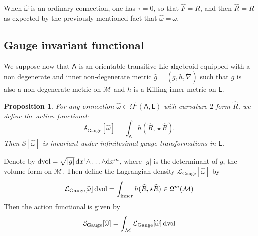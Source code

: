 \documentclass[number]{elsarticle}
\newtheorem{proposition}[theorem]{Proposition}
\theoremstyle{definition}
\theoremstyle{remark}
\numberwithin{equation}{section}
\begin{document}
When ${\widehat{\omega}}$ is an ordinary connection, one has ${\tau} = 0$, so that ${{\widehat{F}}} = R$, and then ${\widehat{R}} = R$ as expected by the previously mentioned fact that ${\widehat{\omega}} = \omega$.

\subsection{Gauge invariant functional}

We suppose now that ${{{{\mathbf{\mathsf{{A}}}}}}}$ is an orientable transitive Lie algebroid equipped with a non degenerate and inner non-degenerate metric ${{\widehat{g}}} = (g,h,{{\mathring{{\nabla}}}})$ such that $g$ is also a non-degenerate metric on ${{{{\mathcal{{M}}}}}}$ and $h$ is a Killing inner metric on ${{{{\mathbf{\mathsf{{L}}}}}}}$.

\begin{proposition}
For any connection ${\widehat{\omega}} \in \Omega^1({{{{\mathbf{\mathsf{{A}}}}}}},{{{{\mathbf{\mathsf{{L}}}}}}})$ with curvature $2$-form ${\widehat{R}}$, we define the action functional:
\begin{equation}
\label{eq-functionalactiongauge}
{\mathcal{S}}_\text{Gauge}[{\widehat{\omega}}] = \int_{{{{\mathbf{\mathsf{{A}}}}}}} h({\widehat{R}},{\mathop{\star}} {\widehat{R}}).
\end{equation}
Then ${\mathcal{S}}[{\widehat{\omega}}]$ is invariant under infinitesimal gauge transformations in ${{{{\mathbf{\mathsf{{L}}}}}}}$.
\end{proposition}

Denote by ${\textnormal{dvol}} = \sqrt{|g|}\,{\text{\textup{d}}} x^1{\mathord{\wedge}}\ldots{\mathord{\wedge}}{\text{\textup{d}}} x^m$, where $|g|$ is the determinant of $g$, the volume form on ${{{{\mathcal{{M}}}}}}$. Then define the Lagrangian density ${{{{\mathcal{{L}}}}}}_\text{Gauge}[{\widehat{\omega}}]$ by
\begin{equation*}
{{{{\mathcal{{L}}}}}}_\text{Gauge}[{\widehat{\omega}}]\, {\textnormal{dvol}} = \int_{{\text{\textup{inner}}}} h({\widehat{R}},{\mathop{\star}} {\widehat{R}}) \in \Omega^m({{{{\mathcal{{M}}}}}})
\end{equation*}
Then the action functional is given by
\begin{equation*}
{\mathcal{S}}_\text{Gauge}[{\widehat{\omega}}] = \int_{{{{\mathcal{{M}}}}}} {{{{\mathcal{{L}}}}}}_\text{Gauge}[{\widehat{\omega}}]\, {\textnormal{dvol}}
\end{equation*}
\end{document}
